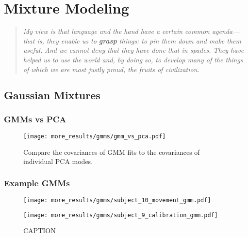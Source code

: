\documentclass[../main.tex]{subfiles}
\begin{document}
\chapter{Mixture Modeling}\label{chap:gmms}

\bigskip
\begin{quote}
  \emph{My view is that language and the hand have a certain common agenda--- that is, they enable us to \textbf{grasp} things: to pin them down and make them useful. And we cannot deny that they have done that in spades. They have helped us to use the world and, by doing so, to develop many of the things of which we are most justly proud, the fruits of civilization.}\\
\end{quote}

\cleardoublepage%




\section{Gaussian Mixtures}




\subsection{GMMs vs PCA}

\begin{figure}[tph]
  \centering
    \texttt{[image: more\_results/gmms/gmm\_vs\_pca.pdf]}
    \caption[GMMs and PCA Covariance]{Compare the covariances of GMM fits to the covariances of individual PCA modes.}\label{fig:gmm_vs_pca}
\end{figure}


\subsection{Example GMMs}

\begin{figure}[tph]
  \centering
  \begin{minipage}{0.49\textwidth}
    \texttt{[image: more\_results/gmms/subject\_10\_movement\_gmm.pdf]}
    \subcaption{}
  \end{minipage}%
  \begin{minipage}{0.49\textwidth}
    \texttt{[image: more\_results/gmms/subject\_9\_calibration\_gmm.pdf]}
    \subcaption{}
  \end{minipage}
  \caption[Example prior GMMs]{CAPTION}\label{fig:example_prior_gmms}
\end{figure}
\end{document}
